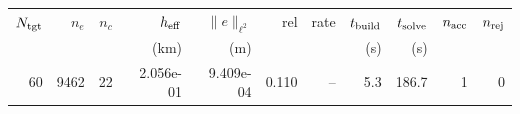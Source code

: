 \begin{tabular}{rrrrrrrrrrr}
\hline
$N_{\rm tgt}$ & $n_e$ & $n_c$ & $h_{\rm eff}$ & $\|e\|_{\ell^2}$ & rel & rate & $t_{\rm build}$ & $t_{\rm solve}$ & $n_{\rm acc}$ & $n_{\rm rej}$ \\
 & & & (km) & (m) & & & (s) & (s) & & \\
\hline
60 & 9462 & 22 & 2.056e-01 & 9.409e-04 & 0.110 & -- & 5.3 & 186.7 & 1 & 0 \\
\hline
\end{tabular}
